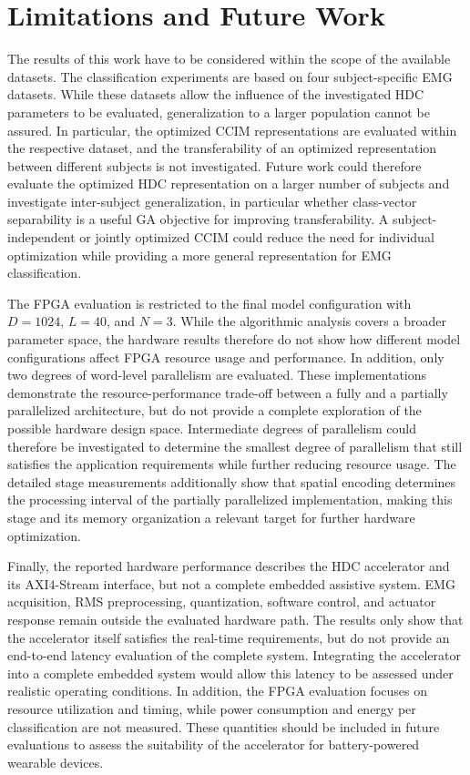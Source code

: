 \section{Limitations and Future Work}
\label{sec:limitations}

The results of this work have to be considered within the scope of the available datasets. The classification experiments are based on four subject-specific EMG datasets. While these datasets allow the influence of the investigated HDC parameters to be evaluated, generalization to a larger population cannot be assured. In particular, the optimized CCIM representations are evaluated within the respective dataset, and the transferability of an optimized representation between different subjects is not investigated. Future work could therefore evaluate the optimized HDC representation on a larger number of subjects and investigate inter-subject generalization, in particular whether class-vector separability is a useful GA objective for improving transferability. A subject-independent or jointly optimized CCIM could reduce the need for individual optimization while providing a more general representation for EMG classification.

The FPGA evaluation is restricted to the final model configuration with $D=1024$, $L=40$, and $N=3$. While the algorithmic analysis covers a broader parameter space, the hardware results therefore do not show how different model configurations affect FPGA resource usage and performance. In addition, only two degrees of word-level parallelism are evaluated. These implementations demonstrate the resource-performance trade-off between a fully and a partially parallelized architecture, but do not provide a complete exploration of the possible hardware design space. Intermediate degrees of parallelism could therefore be investigated to determine the smallest degree of parallelism that still satisfies the application requirements while further reducing resource usage. The detailed stage measurements additionally show that spatial encoding determines the processing interval of the partially parallelized implementation, making this stage and its memory organization a relevant target for further hardware optimization.

Finally, the reported hardware performance describes the HDC accelerator and its AXI4-Stream interface, but not a complete embedded assistive system. EMG acquisition, RMS preprocessing, quantization, software control, and actuator response remain outside the evaluated hardware path. The results only show that the accelerator itself satisfies the real-time requirements, but do not provide an end-to-end latency evaluation of the complete system. Integrating the accelerator into a complete embedded system would allow this latency to be assessed under realistic operating conditions. In addition, the FPGA evaluation focuses on resource utilization and timing, while power consumption and energy per classification are not measured. These quantities should be included in future evaluations to assess the suitability of the accelerator for battery-powered wearable devices.
